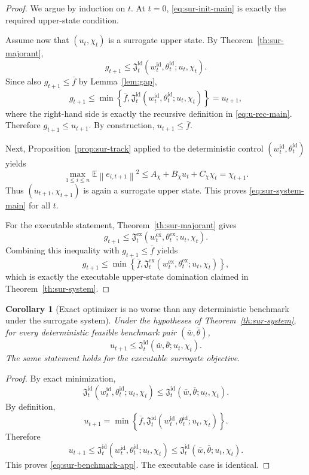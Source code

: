 \documentclass{article}
\newtheorem{corollary}[theorem]{Corollary}
\theoremstyle{definition}
\newcommand{\EE}{\mathbb E}
\newcommand{\norm}[1]{\left\lVert #1\right\rVert}
\begin{document}
\begin{proof}
We argue by induction on $t$. At $t=0$, \eqref{eq:sur-init-main} is exactly the
required upper-state condition.

Assume now that $(u_t,\chi_t)$ is a surrogate upper state. By
Theorem~\ref{th:sur-majorant},
\[
g_{t+1}
\le
\mathfrak J_t^{\mathrm{id}}(w_t^{\mathrm{id}},\theta_t^{\mathrm{id}};u_t,\chi_t).
\]
Since also $g_{t+1}\le \bar f$ by Lemma~\ref{lem:gap},
\[
g_{t+1}
\le
\min\!\left\{
\bar f,
\mathfrak J_t^{\mathrm{id}}(w_t^{\mathrm{id}},\theta_t^{\mathrm{id}};u_t,\chi_t)
\right\}
=u_{t+1},
\]
where the right-hand side is exactly the recursive definition in
\eqref{eq:u-rec-main}. Therefore $g_{t+1}\le u_{t+1}$. By construction,
$u_{t+1}\le \bar f$.

Next, Proposition~\ref{prop:sur-track} applied to the deterministic control
$(w_t^{\mathrm{id}},\theta_t^{\mathrm{id}})$ yields
\[
\max_{1\le i\le n}\EE\norm{e_{i,t+1}}^2
\le
A_\chi+B_\chi u_t+C_\chi\chi_t
=
\chi_{t+1}.
\]
Thus $(u_{t+1},\chi_{t+1})$ is again a surrogate upper state. This proves
\eqref{eq:sur-system-main} for all $t$.

For the executable statement, Theorem~\ref{th:sur-majorant} gives
\[
g_{t+1}
\le
\mathfrak J_t^{\mathrm{ex}}(w_t^{\mathrm{ex}},\theta_t^{\mathrm{ex}};u_t,\chi_t).
\]
Combining this inequality with $g_{t+1}\le \bar f$ yields
\[
g_{t+1}
\le
\min\!\left\{
\bar f,
\mathfrak J_t^{\mathrm{ex}}(w_t^{\mathrm{ex}},\theta_t^{\mathrm{ex}};u_t,\chi_t)
\right\},
\]
which is exactly the executable upper-state domination claimed in
Theorem~\ref{th:sur-system}.
\end{proof}
\begin{corollary}[Exact optimizer is no worse than any deterministic benchmark under the surrogate system]
\label{cor:sur-benchmark}
Under the hypotheses of Theorem~\ref{th:sur-system}, for every deterministic
feasible benchmark pair $(\bar w,\bar\theta)$,
\begin{equation}
u_{t+1}
\le
\mathfrak J_t^{\mathrm{id}}(\bar w,\bar\theta;u_t,\chi_t).
\label{eq:sur-benchmark-app}\end{equation}
The same statement holds for the executable surrogate objective.
\end{corollary}

\begin{proof}
By exact minimization,
\[
\mathfrak J_t^{\mathrm{id}}(w_t^{\mathrm{id}},\theta_t^{\mathrm{id}};u_t,\chi_t)
\le
\mathfrak J_t^{\mathrm{id}}(\bar w,\bar\theta;u_t,\chi_t).
\]
By definition,
\[u_{t+1}
=
\min\!\left\{\bar f,\mathfrak J_t^{\mathrm{id}}(w_t^{\mathrm{id}},\theta_t^{\mathrm{id}};u_t,\chi_t)\right\}.
\]
Therefore
\[u_{t+1}
\le
\mathfrak J_t^{\mathrm{id}}(w_t^{\mathrm{id}},\theta_t^{\mathrm{id}};u_t,\chi_t)
\le
\mathfrak J_t^{\mathrm{id}}(\bar w,\bar\theta;u_t,\chi_t).
\]
This proves \eqref{eq:sur-benchmark-app}. The executable case is identical.
\end{proof}
\end{document}
